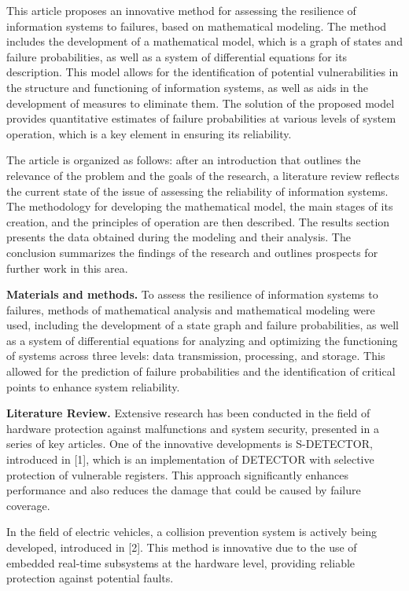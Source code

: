 This article proposes an innovative method for assessing the resilience
of information systems to failures, based on mathematical modeling. The
method includes the development of a mathematical model, which is a
graph of states and failure probabilities, as well as a system of
differential equations for its description. This model allows for the
identification of potential vulnerabilities in the structure and
functioning of information systems, as well as aids in the development
of measures to eliminate them. The solution of the proposed model
provides quantitative estimates of failure probabilities at various
levels of system operation, which is a key element in ensuring its
reliability.

The article is organized as follows: after an introduction that outlines
the relevance of the problem and the goals of the research, a literature
review reflects the current state of the issue of assessing the
reliability of information systems. The methodology for developing the
mathematical model, the main stages of its creation, and the principles
of operation are then described. The results section presents the data
obtained during the modeling and their analysis. The conclusion
summarizes the findings of the research and outlines prospects for
further work in this area.

\textbf{Materials and methods.} To assess the resilience of information
systems to failures, methods of mathematical analysis and mathematical
modeling were used, including the development of a state graph and
failure probabilities, as well as a system of differential equations for
analyzing and optimizing the functioning of systems across three levels:
data transmission, processing, and storage. This allowed for the
prediction of failure probabilities and the identification of critical
points to enhance system reliability.

\textbf{Literature Review.} Extensive research has been conducted in the
field of hardware protection against malfunctions and system security,
presented in a series of key articles. One of the innovative
developments is S-DETECTOR, introduced in {[}1{]}, which is an
implementation of DETECTOR with selective protection of vulnerable
registers. This approach significantly enhances performance and also
reduces the damage that could be caused by failure coverage.

In the field of electric vehicles, a collision prevention system is
actively being developed, introduced in {[}2{]}. This method is
innovative due to the use of embedded real-time subsystems at the
hardware level, providing reliable protection against potential faults.

